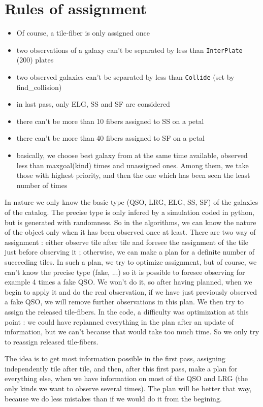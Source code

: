 \documentclass{extarticle}
\begin{document}
\section{Rules of assignment}
\begin{itemize}
	\item Of course, a tile-fiber is only assigned once
	\item two observations of a galaxy can't be separated by less than {\tt InterPlate} (200) plates
	\item two observed galaxies can't be separated by less than {\tt Collide} (set by find\_collision)
	\item in last pass, only ELG, SS and SF are considered
	\item there can't be more than 10 fibers assigned to SS on a petal
	\item there can't be more than 40 fibers assigned to SF on a petal
	\item basically, we choose best galaxy from at the same time available, observed less than maxgoal(kind) times and unassigned ones. Among them, we take those with highest priority, and then the one which has been seen the least number of times
\end{itemize}

In nature we only know the basic type (QSO, LRG, ELG, SS, SF) of the galaxies of the catalog. The precise type is only infered by a simulation coded in python, but is generated with randomness. So in the algorithms, we can know the nature of the object only when it has been observed once at least.
There are two way of assignment : either observe tile after tile and foresee the assignment of the tile just before observing it ; otherwise, we can make a plan for a definite number of succeeding tiles. In such a plan, we try to optimize assignment, but of course, we can't know the precise type (fake, ...) so it is possible to foresee observing for example 4 times a fake QSO. We won't do it, so after having planned, when we begin to apply it and do the real observation, if we have just previously observed a fake QSO, we will remove further observations in this plan. We then try to assign the released tile-fibers. In the code, a difficulty was optimization at this point : we could have replanned everything in the plan after an update of information, but we can't because that would take too much time. So we only try to reassign released tile-fibers.

The idea is to get most information possible in the first pass, assigning independently tile after tile, and then, after this first pass, make a plan for everything else, when we have information on most of the QSO and LRG (the only kinds we want to observe several times). The plan will be better that way, because we do less mistakes than if we would do it from the begining.
\end{document}
